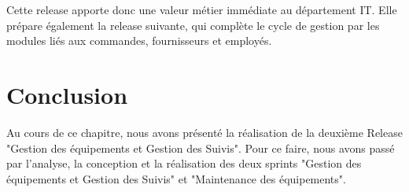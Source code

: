 Cette release apporte donc une valeur métier immédiate au département IT. Elle prépare également la release suivante, qui complète le cycle de gestion par les modules liés aux commandes, fournisseurs et employés.

\section*{Conclusion}
Au cours de ce chapitre, nous avons présenté la réalisation de la deuxième Release "Gestion des équipements et Gestion des Suivis". Pour ce faire, nous avons passé par l’analyse, la conception et la réalisation des deux sprints "Gestion des équipements et Gestion des Suivis" et "Maintenance des équipements".
